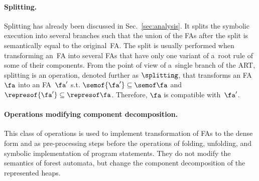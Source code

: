 {%
\paragraph{Splitting.}
Splitting has already been discussed in Sec.~\ref{sec:analysis}.
It splits the symbolic execution into several branches such that the union of
the FAs after the split is semantically equal to the original~FA.
%
The split is usually performed when transforming an~FA into several FAs that
have only one variant of a~root rule of some of their components.
%
From the point of view of a~single branch of the ART,
splitting is an operation, denoted further as $\splitting$, that transforms an
FA $\fa$
into an FA~$\fa'$ s.t. $\semof{\fa'}\subseteq\semof\fa$ and 
$\represof{\fa'}\subseteq\represof\fa$.
Therefore, $\fa$ is compatible with~$\fa'$.


\paragraph{Operations modifying component decomposition.}
This class of operations is used to implement transformation of FAs to the dense form and as
pre-processing steps before the operations of folding, unfolding, and symbolic
implementation of program statements.
%
They do not modify the semantics of forest automata, 
but change the component decomposition of the represented heaps.
%
\begin{itemize}
%


\end{itemize}}

